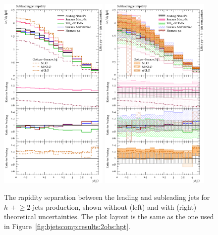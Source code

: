 \begin{figure}[t!]
  \centering
  \includegraphics[width=0.47\textwidth]{figures/hjetscomp_u_jet2_y.pdf}
  \hfill
  \includegraphics[width=0.47\textwidth]{figures/hjetscomp_jet2_y.pdf}
  \caption{\label{fig:hjetscomp:results:2obs:j2y}%
    The rapidity separation between the leading and subleading jets
    for $h\,+\!\ge\!2$-jets production, shown without (left) and with
    (right) theoretical uncertainties. The plot layout is the same as
    the one used in Figure~\ref{fig:hjetscomp:results:2obs:hpt}.}
\end{figure}

